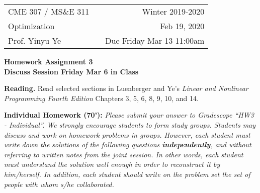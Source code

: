 \documentclass[12pt,letterpaper]{article}
\begin{document}
\pagestyle{empty}
\def \NATUR{ I \hspace*{-0.8ex} N}
\def \REALES{ I \hspace*{-0.8ex} R}
\renewcommand{\labelenumi}{\alph{enumi})}
\renewcommand{\labelenumii}{\roman{enumii})}

\hspace{-6mm}
\begin{tabular}{lcr}
CME 307 / MS\&E 311 & \hspace{3in} & Winter 2019-2020 \\ Optimization & & Feb 19, 2020 \\
Prof. Yinyu Ye & & Due Friday Mar 13 11:00am
\end{tabular}

\bigskip

\begin{center}
{\large \bf Homework Assignment 3 \\  Discuss Session Friday Mar 6 in Class}
\end{center}


\bigskip

{\textbf{Reading.}} Read selected sections in Luenberger and Ye's {\sl Linear
and Nonlinear Programming Fourth Edition} Chapters 3, 5, 6, 8, 9, 10, and 14.

{\textbf{Individual Homework (70'):}}
\emph{Please submit your answer to Gradescope ``HW3 - Individual''. We strongly encourage students to form study groups. Students may discuss and work on homework problems in groups. However, each student must write down the solutions of the following questions \textbf{independently}, and without referring to written notes from the joint session. In other words, each student must understand the solution well enough in order to reconstruct it by him/herself. In addition, each student should write on the problem set the set of people with whom s/he collaborated.}
\end{document}

